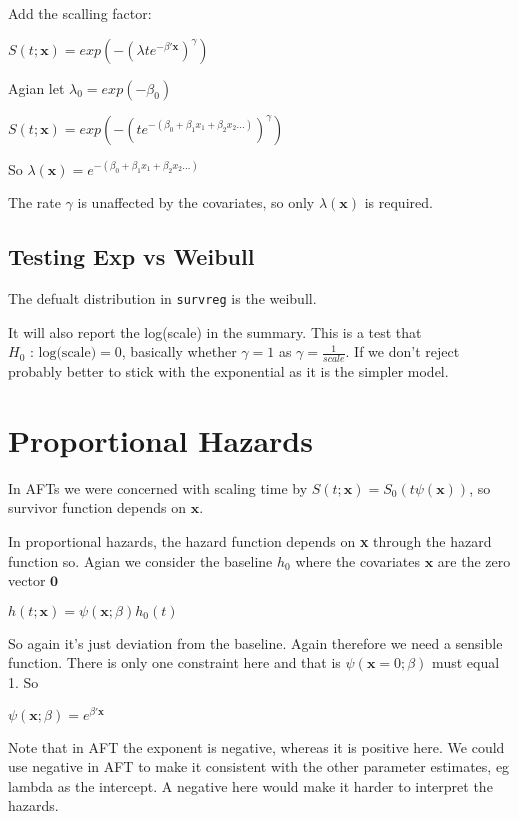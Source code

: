 \documentclass[
  letterpaper,
  DIV=11,
  numbers=noendperiod]{scrreprt}
\begin{document}
Add the scalling factor:

\(S(t;\textbf{x}) = exp(-(\lambda t e^{-\beta ' \textbf{x}})^{\gamma})\)

Agian let \(\lambda_0 = exp(-\beta_0)\)

\(S(t;\textbf{x}) = exp(-( t e^{-(\beta_0 + \beta_1 x_1 + \beta_2 x_2 ...)})^{\gamma})\)

So
\(\lambda(\textbf{x}) = e^{-(\beta_0 + \beta_1 x_1 + \beta_2 x_2 ...)}\)

The rate \(\gamma\) is unaffected by the covariates, so only
\(\lambda(\textbf{x})\) is required.

\hypertarget{testing-exp-vs-weibull}{%
\subsection{Testing Exp vs Weibull}\label{testing-exp-vs-weibull}}

The defualt distribution in \texttt{survreg} is the weibull.

It will also report the log(scale) in the summary. This is a test that
\(H_0 \text{ : log(scale)} = 0\), basically whether \(\gamma = 1\) as
\(\gamma = \frac{1}{scale}\). If we don't reject probably better to
stick with the exponential as it is the simpler model.

\hypertarget{proportional-hazards}{%
\section{Proportional Hazards}\label{proportional-hazards}}

In AFTs we were concerned with scaling time by
\(S(t;\textbf{x}) = S_0(t\psi(\textbf{x}))\), so survivor function
depends on \(\textbf{x}\).

In proportional hazards, the hazard function depends on \textbf{x}
through the hazard function so. Agian we consider the baseline \(h_0\)
where the covariates \(\textbf{x}\) are the zero vector \(\textbf{0}\)

\(h(t;\textbf{x}) = \psi(\textbf{x};\beta) h_0(t)\)

So again it's just deviation from the baseline. Again therefore we need
a sensible function. There is only one constraint here and that is
\(\psi(\textbf{x}=0;\beta)\) must equal 1. So

\(\psi(\textbf{x};\beta) = e^{\beta'\textbf{x}}\)

Note that in AFT the exponent is negative, whereas it is positive here.
We could use negative in AFT to make it consistent with the other
parameter estimates, eg lambda as the intercept. A negative here would
make it harder to interpret the hazards.
\end{document}
